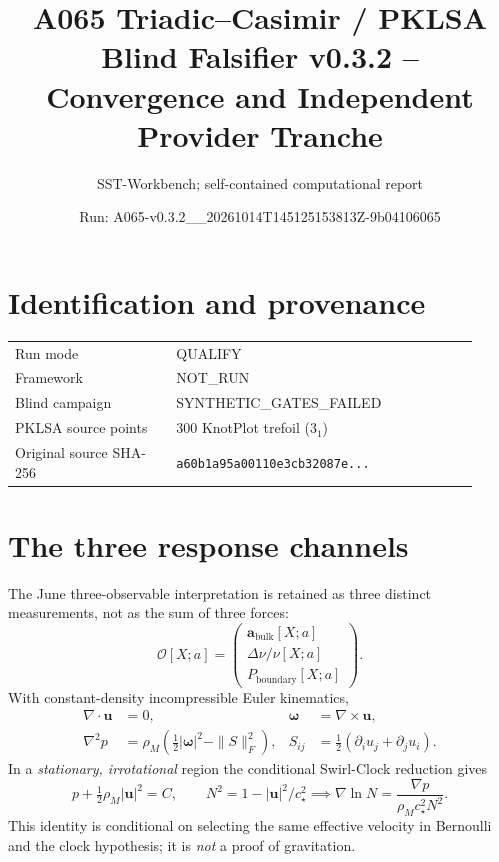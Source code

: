 \documentclass[10pt,a4paper]{article}
\title{A065 Triadic--Casimir / PKLSA\\ Blind Falsifier v0.3.2 -- Convergence and Independent Provider Tranche}
\author{SST-Workbench; self-contained computational report}
\date{Run: A065-v0.3.2\_\_20261014T145125153813Z-9b04106065}
\begin{document}
\maketitle
\begin{center}
\end{center}
\section{Identification and provenance}
\begin{tabular}{@{}p{0.32\linewidth}p{0.60\linewidth}@{}}
\toprule
Run mode & QUALIFY \\
Framework & NOT\_RUN \\
Blind campaign & SYNTHETIC\_GATES\_FAILED \\
PKLSA source points & 300 KnotPlot trefoil ($3_1$) \\
Original source SHA-256 & \texttt{a60b1a95a00110e3cb32087e...} \\
\bottomrule
\end{tabular}
\section{The three response channels}
The June three-observable interpretation is retained as three distinct measurements, not as the sum of three forces:
\[
\mathcal O[X;a]=\begin{pmatrix}
\mathbf a_{\mathrm{bulk}}[X;a]\\
\Delta\nu/\nu[X;a]\\
P_{\mathrm{boundary}}[X;a]
\end{pmatrix}.
\]
With constant-density incompressible Euler kinematics,
\begin{align}
\nabla\cdot\mathbf u&=0,&
\boldsymbol\omega&=\nabla\times\mathbf u,\\
\nabla^2p&=\rho_M\left(\tfrac12|\boldsymbol\omega|^2-\|S\|_F^2\right),&
S_{ij}&=\tfrac12(\partial_i u_j+\partial_j u_i).
\end{align}
In a \emph{stationary, irrotational} region the conditional Swirl-Clock reduction gives
\[
p+\tfrac12\rho_M|\mathbf u|^2=C,\qquad
N^2=1-|\mathbf u|^2/c_\star^2
\implies\nabla\ln N=\frac{\nabla p}{\rho_Mc_\star^2N^2}.
\]
This identity is conditional on selecting the same effective velocity in Bernoulli and the clock hypothesis; it is \emph{not} a proof of gravitation.
\end{document}
